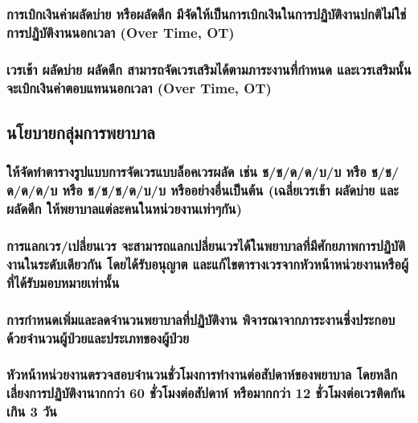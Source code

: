 \hspace{0.5cm}\hangindent=2.6cm\subsubsection{การเบิกเงินค่าผลัดบ่าย หรือผลัดดึก มีจัดให้เป็นการเบิกเงินในการปฏิบัติงานปกติไม่ใช่การปฏิบัติงานนอกเวลา (Over Time, OT)}

\hspace{0.5cm}\hangindent=2.6cm\subsubsection{เวรเช้า ผลัดบ่าย ผลัดดึก สามารถจัดเวรเสริมได้ตามภาระงานที่กำหนด และเวรเสริมนั้นจะเบิกเงินค่าตอบแทนนอกเวลา (Over Time, OT)}

\clearpage

\hspace{0pt}\subsection{นโยบายกลุ่มการพยาบาล}

\hspace{0.5cm}\hangindent=2.6cm\subsubsection{ให้จัดทำตารางรูปแบบการจัดเวรแบบล็อคเวรผลัด เช่น ช/ช/ด/ด/บ/บ หรือ ช/ช/ด/ด/ด/บ หรือ ช/ช/ช/ด/บ/บ หรืออย่างอื่นเป็นต้น (เฉลี่ยเวรเข้า ผลัดบ่าย และผลัดดึก ให้พยาบาลแต่ละคนในหน่วยงานเท่าๆกัน)}

\hspace{0.5cm}\hangindent=2.6cm\subsubsection{การแลกเวร/เปลี่ยนเวร จะสามารถแลกเปลี่ยนเวรได้ในพยาบาลที่มีศักยภาพการปฏิบัติงานในระดับเดียวกัน โดยได้รับอนุญาต และแก้ไขตารางเวรจากหัวหน้าหน่วยงานหรือผู้ที่ได้รับมอบหมายเท่านั้น}

\hspace{0.5cm}\hangindent=2.6cm\subsubsection{การกำหนดเพิ่มและลดจำนวนพยาบาลที่ปฏิบัติงาน พิจารณาจากภาระงานซึ่งประกอบด้วยจำนวนผู้ป่วยและประเภทของผู้ป่วย}

\hspace{0.5cm}\hangindent=2.6cm\subsubsection{หัวหน้าหน่วยงานตรวจสอบจำนวนชั่วโมงการทำงานต่อสัปดาห์ของพยาบาล โดยหลีกเลี่ยงการปฏิบัติงานากกว่า 60 ชั่วโมงต่อสัปดาห์ หรือมากกว่า 12 ชั่วโมงต่อเวรติดกันเกิน 3 วัน}

